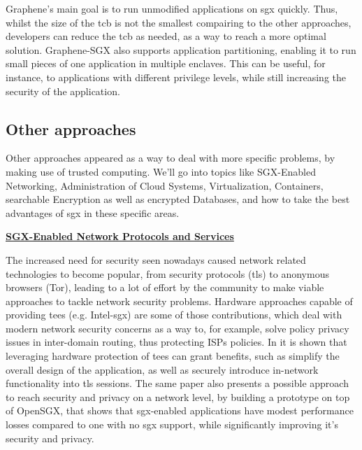 Graphene's main goal is to run unmodified applications on \gls{sgx} quickly. Thus, whilst the size of the \gls{tcb} is not the smallest compairing to the other approaches, developers can reduce the \gls{tcb} as needed, as a way to reach a more optimal solution. 
Graphene-SGX also supports application partitioning, enabling it to run small pieces of one application in multiple enclaves. This can be useful, for instance, to applications with different privilege levels, while still increasing the security of the application.
\subsection{Other approaches}
\label{ssec:otherSGXFrameworks}



Other approaches appeared as a way to deal with more specific problems, by making use of trusted computing. We'll go into topics like SGX-Enabled Networking, Administration of Cloud Systems, Virtualization, Containers, searchable Encryption as well as encrypted Databases, and how to take the best advantages of \gls{sgx} in these specific areas. \newline


\underline{\textbf{SGX-Enabled Network Protocols and Services}}


The increased need for security seen nowadays caused network related technologies to become popular, from security protocols (\gls{tls}) to anonymous browsers (Tor), leading to a lot of effort by the community to make viable approaches to tackle network security problems. 
Hardware approaches capable of providing \gls{tee}s (e.g. Intel-\gls{sgx}) are some of those contributions, which deal with modern network security concerns as a way to, for example, solve policy privacy issues in inter-domain routing, thus protecting ISPs policies.
In \cite{torSGXPaper} it is shown that leveraging hardware protection of \gls{tee}s can grant benefits, such as simplify the overall design of the application, as well as securely introduce in-network functionality into \gls{tls} sessions. The same paper also presents a possible approach to reach security and privacy on a network level, by building a prototype on top of OpenSGX, that shows that \gls{sgx}-enabled applications have modest performance losses compared to one with no \gls{sgx} support, while significantly improving it’s security and privacy.

